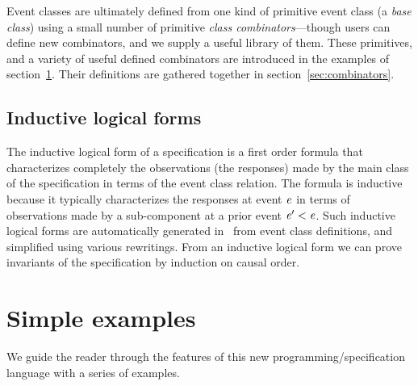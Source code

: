 \documentclass[final]{article}
\begin{document}
%
Event classes are ultimately defined from one kind of primitive event
class (a \emph{base class}) using a small number of primitive
\emph{class combinators}---though users can define new combinators,
and we supply a useful library of them.  These primitives, and a
variety of useful defined combinators are introduced in the examples
of section~\ref{examples}.  Their definitions are gathered together in
section~\ref{sec:combinators}.

\subsection{Inductive logical forms}

The inductive logical form of a specification is a first order formula
that characterizes completely the observations (the responses) made by
the main class of the specification in terms of the event class
relation.  The formula is inductive because it typically characterizes
the responses at event $\mathit{e}$ in terms of observations made by
a sub-component at a prior event
$\mathit{e}'<\mathit{e}$.
%
Such inductive logical forms are automatically generated in
\nuprl\ from event class definitions, and simplified using various
rewritings.  From an inductive logical form we can prove
invariants of the specification by induction on causal order.

\section{Simple examples}
\label{examples}

We guide the reader through the features of this new
programming/specification language with a series of examples.





\end{document}
